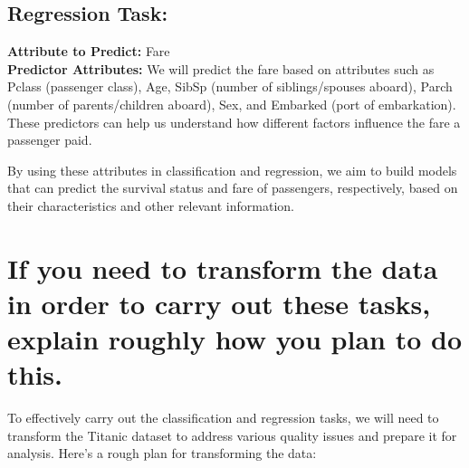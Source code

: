\documentclass[twoside,11pt]{article}
\begin{document}
\subsection*{Regression Task:}
\textbf{Attribute to Predict:} Fare \\
\textbf{Predictor Attributes:} We will predict the fare based on attributes such as Pclass (passenger class), Age, SibSp (number of siblings/spouses aboard), Parch (number of parents/children aboard), Sex, and Embarked (port of embarkation). These predictors can help us understand how different factors influence the fare a passenger paid.

By using these attributes in classification and regression, we aim to build models that can predict the survival status and fare of passengers, respectively, based on their characteristics and other relevant information.

\section{If you need to transform the data in order to carry out these tasks, explain roughly how you plan to do this.}
To effectively carry out the classification and regression tasks, we will need to transform the Titanic dataset to address various quality issues and prepare it for analysis. Here’s a rough plan for transforming the data:
\end{document}
